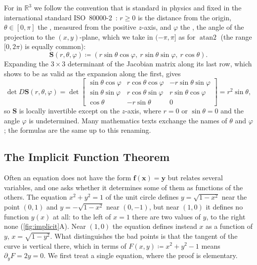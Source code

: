 For  in $\mathbb R^3$ we follow the convention that is standard in physics and fixed in the international standard ISO~80000-2~\cite{iso80000-2}: $r\ge0$ is the distance from the origin, $\theta\in[0,\pi]$ the , measured from the positive $z$-axis, and $\varphi$ the , the angle of the projection to the $(x,y)$-plane, which we take in $(-\pi,\pi]$ as for $\operatorname{atan2}$ (the range $[0,2\pi)$ is equally common):
\[
\mathbf S(r,\theta,\varphi)\coloneqq(r\sin\theta\cos\varphi,\ r\sin\theta\sin\varphi,\ r\cos\theta).
\]
Expanding the $3\times3$ determinant of the Jacobian matrix along its last row, which  shows to be as valid as the expansion along the first, gives
\[
\det D\mathbf S(r,\theta,\varphi)=\det\begin{bmatrix}\sin\theta\cos\varphi&r\cos\theta\cos\varphi&-r\sin\theta\sin\varphi\\\sin\theta\sin\varphi&r\cos\theta\sin\varphi&r\sin\theta\cos\varphi\\\cos\theta&-r\sin\theta&0\end{bmatrix}=r^2\sin\theta ,
\]
so $\mathbf S$ is locally invertible except on the $z$-axis, where $r=0$ or $\sin\theta=0$ and the angle $\varphi$ is undetermined. Many mathematics texts exchange the names of $\theta$ and $\varphi$; the formulas are the same up to this renaming.

\subsection{The Implicit Function Theorem}

Often an equation does not have the form $\mathbf f(\mathbf x)=\mathbf y$ but relates several variables, and one asks whether it determines some of them as functions of the others. The equation $x^2+y^2=1$ of the unit circle defines $y=\sqrt{1-x^2}$ near the point $(0,1)$ and $y=-\sqrt{1-x^2}$ near $(0,-1)$, but near $(1,0)$ it defines no function $y(x)$ at all: to the left of $x=1$ there are two values of $y$, to the right none (\cref{fig:implicit}A). Near $(1,0)$ the equation defines instead $x$ as a function of $y$, $x=\sqrt{1-y^2}$. What distinguishes the bad points is that the tangent of the curve is vertical there, which in terms of $F(x,y)\coloneqq x^2+y^2-1$ means $\partial_yF=2y=0$. We first treat a single equation, where the proof is elementary.

